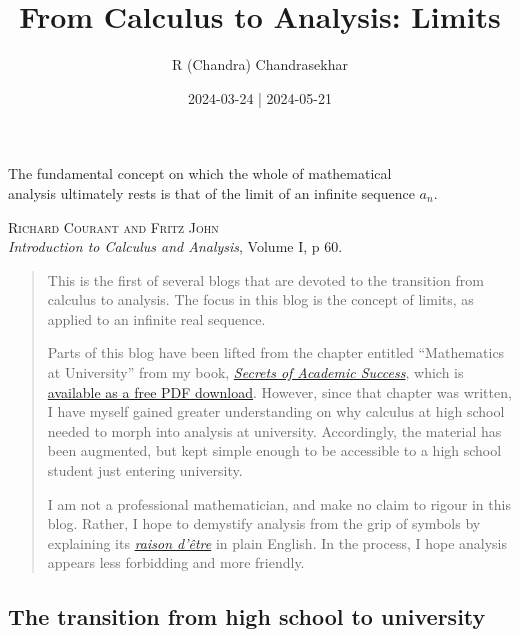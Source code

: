 \documentclass[
  a4paper,
]{article}
\title{From Calculus to Analysis: Limits}
\author{R (Chandra) Chandrasekhar}
\date{2024-03-24 | 2024-05-21}
\begin{document}
\maketitle

\thispagestyle{empty}


\begin{flushright}

\begin{footnotesize}

The fundamental concept on which the whole of mathematical\\
analysis ultimately rests is that of the limit of an infinite sequence
\(a_{n}\).

\textsc{Richard Courant and Fritz John}\\
\emph{Introduction to Calculus and Analysis}, Volume I, p 60.

\end{footnotesize}

\end{flushright}

\begin{quote}
This is the first of several blogs that are devoted to the transition
from calculus to analysis. The focus in this blog is the concept of
limits, as applied to an infinite real sequence.

Parts of this blog have been lifted from the chapter entitled
``Mathematics at University'' from my book,
\href{https://swanlotus.netlify.app/sas}{\emph{Secrets of Academic
Success}}, which is
\href{https://swanlotus.netlify.app/sas-manuscript/SAS-partial.pdf}{available
as a free PDF download}. However, since that chapter was written, I have
myself gained greater understanding on why calculus at high school
needed to morph into analysis at university. Accordingly, the material
has been augmented, but kept simple enough to be accessible to a high
school student just entering university.

I am not a professional mathematician, and make no claim to rigour in
this blog. Rather, I hope to demystify analysis from the grip of symbols
by explaining its
\href{https://www.thefreedictionary.com/raison+d+etre}{\emph{raison
d'être}} in plain English. In the process, I hope analysis appears less
forbidding and more friendly.
\end{quote}

\subsection{The transition from high school to
university}\label{the-transition-from-high-school-to-university}
\end{document}
